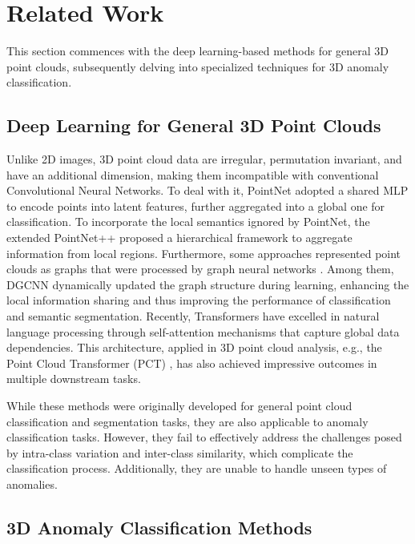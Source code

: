 \section{Related Work}
\label{related}

This section commences with the deep learning-based methods for general 3D point clouds, subsequently delving into specialized techniques for 3D anomaly classification.

\subsection{Deep Learning for General 3D Point Clouds}

Unlike 2D images, 3D point cloud data are irregular, permutation invariant, and have an additional dimension, making them incompatible with conventional Convolutional Neural Networks. To deal with it, PointNet \citep{qi2017pointnet} adopted a shared MLP to encode points into latent features, further aggregated into a global one for classification. To incorporate the local semantics ignored by PointNet, the extended PointNet++ \citep{qi2017pointnet++} proposed a hierarchical framework to aggregate information from local regions. Furthermore, some approaches represented point clouds as graphs that were processed by graph neural networks \citep{te2018rgcnn,wang2019dynamic}. Among them, DGCNN \citep{wang2019dynamic} dynamically updated the graph structure during learning, enhancing the local information sharing and thus improving the performance of classification and semantic segmentation. Recently, Transformers have excelled in natural language processing through self-attention mechanisms that capture global data dependencies. This architecture, applied in 3D point cloud analysis, e.g., the Point Cloud Transformer (PCT) \citep{guo2021pct}, has also achieved impressive outcomes in multiple downstream tasks.

While these methods were originally developed for general point cloud classification and segmentation tasks, they are also applicable to anomaly classification tasks. However, they fail to effectively address the challenges posed by intra-class variation and inter-class similarity, which complicate the classification process. Additionally, they are unable to handle unseen types of anomalies.



\subsection{3D Anomaly Classification Methods}

